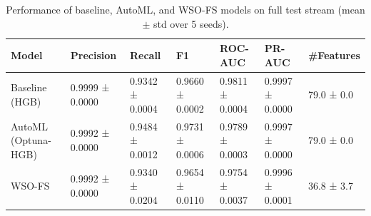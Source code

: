 \begin{table}
\caption{Performance of baseline, AutoML, and WSO-FS models on full test stream (mean $\pm$ std over 5 seeds).}
\label{tab:baseline_results}
\begin{tabular}{lllllll}
\toprule
Model & Precision & Recall & F1 & ROC-AUC & PR-AUC & #Features \\
\midrule
Baseline (HGB) & 0.9999 ± 0.0000 & 0.9342 ± 0.0004 & 0.9660 ± 0.0002 & 0.9811 ± 0.0004 & 0.9997 ± 0.0000 & 79.0 ± 0.0 \\
AutoML (Optuna-HGB) & 0.9992 ± 0.0000 & 0.9484 ± 0.0012 & 0.9731 ± 0.0006 & 0.9789 ± 0.0003 & 0.9997 ± 0.0000 & 79.0 ± 0.0 \\
WSO-FS & 0.9992 ± 0.0000 & 0.9340 ± 0.0204 & 0.9654 ± 0.0110 & 0.9754 ± 0.0037 & 0.9996 ± 0.0001 & 36.8 ± 3.7 \\
\bottomrule
\end{tabular}
\end{table}
